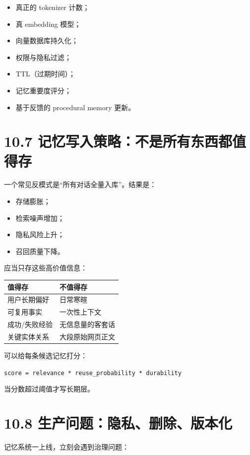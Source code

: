 \begin{itemize}[leftmargin=2em]
\item 真正的 tokenizer 计数；
\item 真 embedding 模型；
\item 向量数据库持久化；
\item 权限与隐私过滤；
\item TTL（过期时间）；
\item 记忆重要度评分；
\item 基于反馈的 procedural memory 更新。
\end{itemize}

\section{10.7 记忆写入策略：不是所有东西都值得存}

一个常见反模式是``所有对话全量入库''。结果是：


\begin{itemize}[leftmargin=2em]
\item 存储膨胀；
\item 检索噪声增加；
\item 隐私风险上升；
\item 召回质量下降。
\end{itemize}

应当只存这些高价值信息：


\begingroup
\scriptsize
\setlength{\tabcolsep}{3pt}
\begin{longtable}{|p{}|p{}|}
\hline
值得存 & 不值得存 \\ \hline
用户长期偏好 & 日常寒暄 \\ \hline
可复用事实 & 一次性上下文 \\ \hline
成功/失败经验 & 无信息量的客套话 \\ \hline
关键实体关系 & 大段原始网页正文 \\ \hline
\end{longtable}
\endgroup

可以给每条候选记忆打分：


\texttt{score = relevance * reuse\_probability * durability}


当分数超过阈值才写长期层。


\section{10.8 生产问题：隐私、删除、版本化}

记忆系统一上线，立刻会遇到治理问题：


